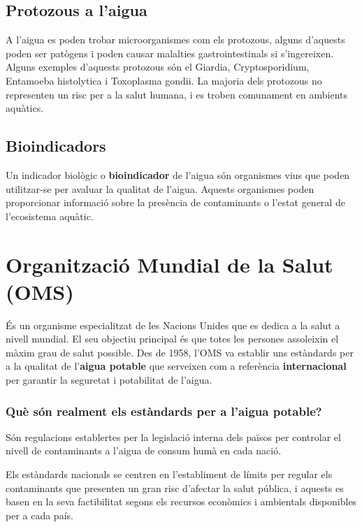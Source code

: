 \subsection{Protozous a l’aigua} \label{subsec:protozous}
A l’aigua es poden trobar microorganismes com els protozous, alguns d’aquests poden ser patògens i poden causar malalties gastrointestinals si s’ingereixen. Alguns exemples d’aquests protozous són el Giardia, Cryptosporidium, Entamoeba histolytica i Toxoplasma gondii. La majoria dels protozous no representen un risc per a la salut humana, i es troben comunament en ambients aquàtics.
\subsection{Bioindicadors} \label{subsec:indicadorbiologic}
Un indicador biològic o \textbf{bioindicador} de l’aigua són organismes vius que poden utilitzar-se per avaluar la qualitat de l’aigua. Aquests organismes poden proporcionar informació sobre la presència de contaminants o l’estat general de l’ecosistema aquàtic.



\section{Organització Mundial de la Salut (OMS)}
És un organisme especialitzat de les Nacions Unides que es dedica a la salut a nivell mundial. El seu objectiu principal és que totes les persones assoleixin el màxim grau de salut possible.
Des de 1958, l'OMS va establir uns estàndards per a la qualitat de l’\textbf{aigua potable} que serveixen com a referència \textbf{internacional} per garantir la seguretat i potabilitat de l’aigua.
\subsubsection{Què són realment els estàndards per a l’aigua potable?}
Són regulacions establertes per la legislació interna dels països per controlar el nivell de contaminants a l’aigua de consum humà en cada nació.

Els estàndards nacionals se centren en l’establiment de límits per regular els contaminants que presenten un gran risc d’afectar la salut pública, i aquests es basen en la seva factibilitat segons els recursos econòmics i ambientals disponibles per a cada país.

